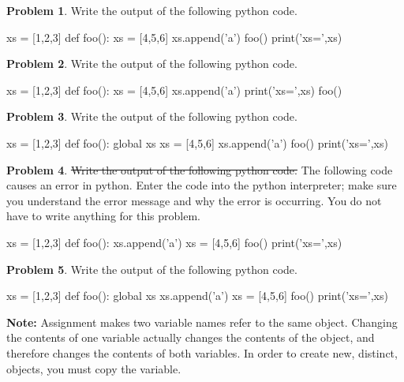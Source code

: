\documentclass[12pt]{article}
\theoremstyle{definition}
\newtheorem{problem}{Problem}
\begin{document}
\newpage
\begin{problem}
Write the output of the following python code.
\begin{python}
xs = [1,2,3]
def foo():
    xs = [4,5,6]
    xs.append('a')
foo()
print('xs=',xs)
\end{python}
\end{problem}
\vspace{1in}

\begin{problem}
Write the output of the following python code.
\begin{python}
xs = [1,2,3]
def foo():
    xs = [4,5,6]
    xs.append('a')
    print('xs=',xs)
foo()
\end{python}
\end{problem}
\vspace{1in}

\begin{problem}
Write the output of the following python code.
\begin{python}
xs = [1,2,3]
def foo():
    global xs
    xs = [4,5,6]
    xs.append('a')
foo()
print('xs=',xs)
\end{python}
\end{problem}
\vspace{1in}

\newpage
\begin{problem}
\sout{Write the output of the following python code.}
The following code causes an error in python.
Enter the code into the python interpreter;
make sure you understand the error message and why the error is occurring.
You do not have to write anything for this problem.
\begin{python}
xs = [1,2,3]
def foo():
    xs.append('a')
    xs = [4,5,6]
foo()
print('xs=',xs)
\end{python}
\end{problem}
\vspace{1in}

\begin{problem}
Write the output of the following python code.
\begin{python}
xs = [1,2,3]
def foo():
    global xs
    xs.append('a')
    xs = [4,5,6]
foo()
print('xs=',xs)
\end{python}
\end{problem}
\vspace{1in}

\newpage
\noindent
\textbf{Note:}
Assignment makes two variable names refer to the same object.
Changing the contents of one variable actually changes the contents of the object,
and therefore changes the contents of both variables.
In order to create new, distinct, objects, you must copy the variable.
\end{document}

